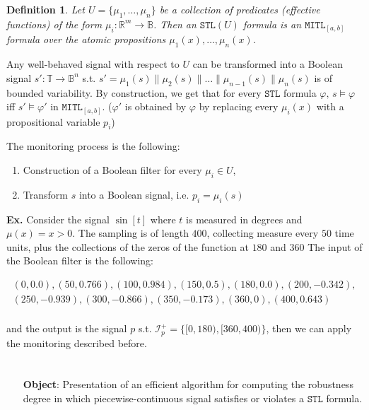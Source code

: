 \documentclass{suftesi}
\newtheorem*{definition}{Definition}
\renewcommand{\b}{\textbf}
\newcommand{\STL}{$\mathtt{STL}$ }
\begin{document}
\begin{definition}
    Let $U=\{\mu_1,\dots,\mu_n\}$ be a collection of predicates (effective functions) of the form $\mu_i:\mathbb{R}^m\to\mathbb{B}$. Then an $\mathtt{STL}(U)$ formula is an $\mathtt{MITL}_{[a,b]}$ formula over the atomic propositions $\mu_1(x),\dots,\mu_n(x)$.
\end{definition}

Any well-behaved signal with respect to $U$ can be transformed into a Boolean signal $s':\mathbb{T}\to\mathbb{B}^n$ s.t. $s'=\mu_1(s)\|\mu_2(s)\|\dots\|\mu_{n-1}(s)\|\mu_n(s)$ is of bounded variability. By construction, we get that for every \STL formula $\varphi,\, s\vDash\varphi$ iff $s'\vDash\varphi'$ in $\mathtt{MITL}_{[a,b]}$. ($\varphi'$ is obtained by $\varphi$ by replacing every $\mu_i(x)$ with a  propositional variable $p_i$)

The monitoring process is the following:
\begin{enumerate}[leftmargin=0.5cm]
    \item Construction of a Boolean filter for every $\mu_i\in U$, 
    \item Transform $s$ into a Boolean signal, i.e. $p_i=\mu_i(s)$
\end{enumerate}

\b{Ex.} Consider the signal $\sin[t]$ where $t$ is measured in degrees and $\mu(x)=x>0$. The sampling is of length $400$, collecting measure every $50$ time units, plus the collections of the zeros of the function at $180$ and $360$ The input of the Boolean filter is the following:

\begin{gather*}
    (0, 0.0), (50, 0.766), (100, 0.984), (150, 0.5), (180, 0.0), (200, -0.342), \\
    (250, -0.939), (300, -0.866), (350, -0.173), (360, 0), (400, 0.643)\\
\end{gather*}

and the output is the signal $p$ s.t. $\mathcal{I}^+_p=\{[0,180),[360,400)\}$, then we can apply the monitoring described before.

\chapter{}

\begin{itemize} [leftmargin=1.25cm]
    \item [\b{Object}:] Presentation of an efficient algorithm for computing the robustness degree in which piecewise-continuous signal satisfies or violates a \STL formula.
\end{itemize}
\end{document}
